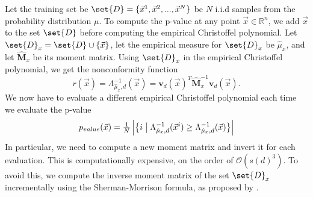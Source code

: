 \documentclass[pmlr]{jmlr}%
\begin{document}
Let the training set be $\set{D} = \{ \Vec{x}^1 ,\Vec{x}^2,...,\Vec{x}^N  \}$ be $N$ i.i.d samples from the probability distribution $\mu$. To compute the p-value at any point $\Vec{x} \in  \mathbb{R}^n$, we add $\Vec{x}$ to the set $\set{D}$ before computing the empirical Christoffel polynomial. 
 Let $\set{D}_x = \set{D} \cup \{ \Vec{x} \}$, let the empirical measure for $\set{D}_x$ be $\hat{\mu}_x$, and let $\widehat{\mathbf{M}}_x$ be its moment matrix. 
Using $\set{D}_x$ in the empirical Christoffel polynomial, we get the nonconformity function
 $$
r(\Vec{x}) =  \Lambda^{-1}_{\hat{\mu}_x, d}(\Vec{x}) = \mathbf{v}_{d}(\Vec{x})^T \widehat{\mathbf{M}}_x^{-1}\mathbf{v}_{d}(\Vec{x}).
 $$
%
 We now have to evaluate a different empirical Christoffel polynomial each time we evaluate the p-value
 \[  p_{value}(\Vec{x})=\tfrac{1}{N}\left|\bigl\{i  \bigm| \Lambda^{-1}_{\hat{\mu}_x, d}(\Vec{x}^{i})\geq \Lambda^{-1}_{\hat{\mu}_x, d}(\Vec{x})\bigr\}\right| \]
In particular, we need to compute a new moment matrix and invert it for each evaluation. This is computationally expensive, on the order of $\mathcal{O}(s(d)^3)$. To avoid this, we compute the inverse moment matrix of the set $\set{D}_x$ incrementally using the Sherman-Morrison formula, as proposed by \cite{ducharlet2022leveraging}. 
\end{document}
